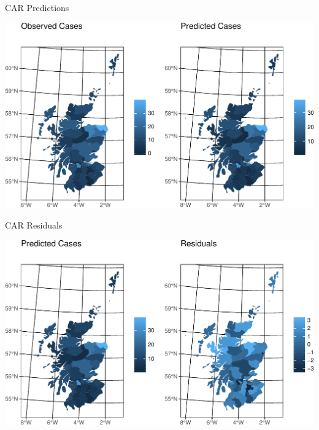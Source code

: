 \documentclass[11pt,ignorenonframetext,]{beamer}
\begin{document}
\begin{frame}{CAR Predictions}
\protect\hypertarget{car-predictions}{}

\begin{center}\includegraphics[width=\textwidth]{Lec19_files/figure-beamer/unnamed-chunk-14-1} \end{center}

\end{frame}

\begin{frame}{CAR Residuals}
\protect\hypertarget{car-residuals}{}

\begin{center}\includegraphics[width=\textwidth]{Lec19_files/figure-beamer/unnamed-chunk-15-1} \end{center}

\end{frame}
\end{document}
